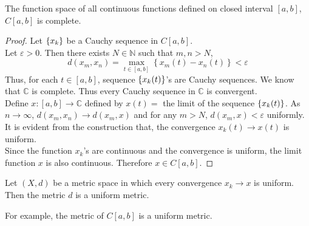 \begin{theorem}
	The function space of all continuous functions defined on closed interval $[a,b]$, $C[a,b]$ is complete.
\end{theorem}
\begin{proof}
	Let $\{x_k\}$ be a Cauchy sequence in $C[a,b]$.\\
	Let $\varepsilon > 0$.
	Then there exists $N \in \mathbb{N}$ such that $m,n > N$, 
	$$ d(x_m,x_n) = \max_{t \in [a,b]} \left\{ x_m(t) - x_n(t) \right\} < \varepsilon $$
	Thus, for each $t \in [a,b]$, sequence $\{x_k(t)\}$'s are Cauchy sequences.
	We know that $\mathbb{C}$ is complete.
	Thus every Cauchy sequence in $\mathbb{C}$ is convergent.\\

	Define $x : [a,b] \to \mathbb{C}$ defined by $x(t) = $ the limit of the sequence $\{x_k(t)\}$.
	As $n \to \infty$, $d(x_m,x_n) \to d(x_m,x)$ and for any $m > N$, $d(x_m,x) < \varepsilon$ uniformly.
	It is evident from the construction that, the convergence $x_k(t) \to x(t)$ is uniform.\\

	Since the function $x_k$'s are continuous and the convergence is uniform, the limit function $x$ is also continuous.
	Therefore $x \in C[a,b]$.
\end{proof}

\begin{definition}
	Let $(X,d)$ be a metric space in which every convergence $x_k \to x$ is uniform.
	Then the metric $d$ is a uniform metric.
\end{definition}
For example, the metric of $C[a,b]$ is a uniform metric.

